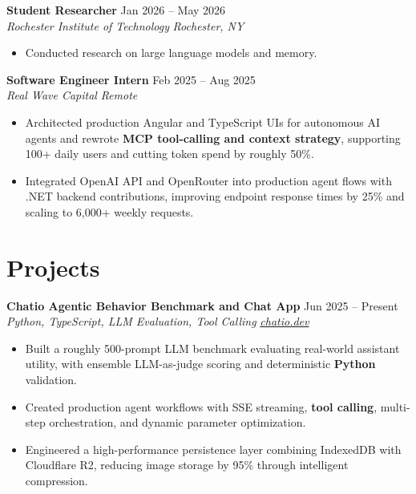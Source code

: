 \documentclass[10pt,letterpaper]{article}
\newif\ifresumeFirstRole
\newcommand{\resumeRole}[4]{%
  \ifresumeFirstRole
    \global\resumeFirstRolefalse
  \else
    \vspace{0pt plus 1fill}%
  \fi
  \textbf{#1} \hfill #2\\
  \textit{#3} \hfill \textit{#4}
}
\begin{document}
\resumeRole{Student Researcher}{Jan 2026 -- May 2026}{Rochester Institute of Technology}{Rochester, NY}
\begin{itemize}
  \item Conducted research on large language models and memory.
\end{itemize}

\resumeRole{Software Engineer Intern}{Feb 2025 -- Aug 2025}{Real Wave Capital}{Remote}
\begin{itemize}
  \item Architected production Angular and TypeScript UIs for autonomous AI agents and rewrote \textbf{MCP tool-calling and context strategy}, supporting 100+ daily users and cutting token spend by roughly 50\%.
  \item Integrated OpenAI API and OpenRouter into production agent flows with .NET backend contributions, improving endpoint response times by 25\% and scaling to 6,000+ weekly requests.
\end{itemize}

\section*{Projects}
\resumeRole{Chatio Agentic Behavior Benchmark and Chat App}{Jun 2025 -- Present}{Python, TypeScript, LLM Evaluation, Tool Calling}{\href{https://chatio.dev}{chatio.dev}}
\begin{itemize}
  \item Built a roughly 500-prompt LLM benchmark evaluating real-world assistant utility, with ensemble LLM-as-judge scoring and deterministic \textbf{Python} validation.
  \item Created production agent workflows with SSE streaming, \textbf{tool calling}, multi-step orchestration, and dynamic parameter optimization.
  \item Engineered a high-performance persistence layer combining IndexedDB with Cloudflare R2, reducing image storage by 95\% through intelligent compression.
\end{itemize}
\end{document}
